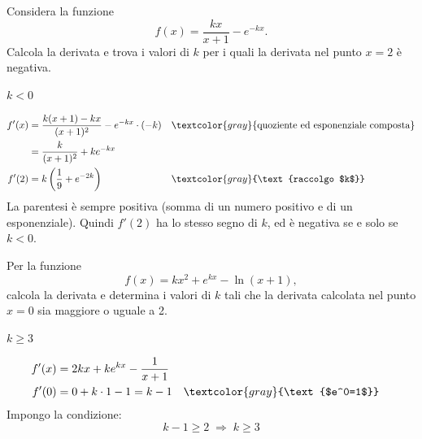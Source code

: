 
\begin{question}[ID=4.4, subtitle={Derivata di $kx/(x+1)-e^{-kx}$ negativa in $x=2$}, tags={derivate, parametrico}, difficulty=media]
Considera la funzione
\[
f(x) = \frac{kx}{x+1} - e^{-kx}.
\]
Calcola la derivata e trova i valori di \( k \) per i quali la derivata nel punto \( x = 2 \) è negativa.
\begin{solution}
$k<0$
\end{solution}
\begin{explanation}
\[\begin{aligned}
f'(x) &= \dfrac{k(x+1)-kx}{(x+1)^2}-e^{-kx}\cdot(-k) && \textcolor{gray}{\text{quoziente ed esponenziale composta}}\\
&= \dfrac{k}{(x+1)^2}+ke^{-kx}\\
f'(2) &= k\left(\dfrac19+e^{-2k}\right) && \textcolor{gray}{\text{raccolgo $k$}}
\end{aligned}\]
La parentesi è sempre positiva (somma di un numero positivo e di un esponenziale). Quindi $f'(2)$ ha lo stesso segno di $k$, ed è negativa se e solo se $k<0$.
\end{explanation}
\end{question}


\begin{question}[ID=4.5, subtitle={Derivata di $kx^2+e^{kx}-\ln(x+1)$ in $x=0$ maggiore o uguale a 2}, tags={derivate, parametrico}, difficulty=media]
Per la funzione
\[
f(x) = kx^2 + e^{kx} - \ln(x+1),
\]
calcola la derivata e determina i valori di \( k \) tali che la derivata calcolata nel punto \( x = 0 \) sia maggiore o uguale a 2.
\begin{solution}
$k\geq3$
\end{solution}
\begin{explanation}
\[\begin{aligned}
f'(x) &= 2kx+ke^{kx}-\dfrac{1}{x+1}\\
f'(0) &= 0+k\cdot1-1=k-1 && \textcolor{gray}{\text{$e^0=1$}}
\end{aligned}\]
Impongo la condizione:
\[ k-1\geq2 \;\Rightarrow\; k\geq3 \]
\end{explanation}
\end{question}

